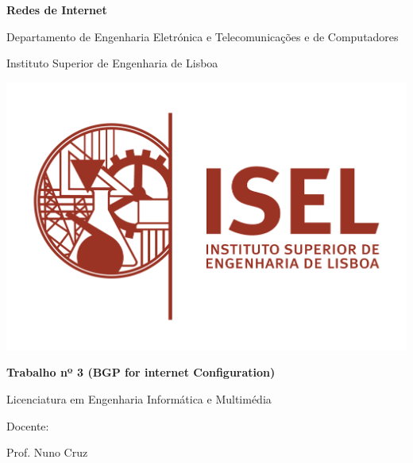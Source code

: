 \documentclass[11pt,english, openright, oneside]{book}
\begin{document}


\renewcommand{\contentsname}{Índice}

\begin{titlepage}
	\clearpage\thispagestyle{empty}
	\centering
	\vspace{1cm}

	{\Large \textbf{Redes de Internet}\par} {\Large Departamento de Engenharia
	Eletrónica e Telecomunicações e de Computadores \par} {\Large Instituto
	Superior de Engenharia de Lisboa \par}
		
	\vspace{0.5cm}
    
    \centering \includegraphics[scale=0.7]{imagens/ISEL.png}

	\vspace{1cm}
	
	{\Huge \textbf{Trabalho nº 3 (BGP for internet Configuration)}} \\
	\vspace{1cm}

        {\Large Licenciatura em Engenharia Informática e Multimédia}
        
	\vspace{0.5cm}
	
	
	
	
	\begin{center}
	{\normalsize Docente: \par Prof. Nuno Cruz \\
	
}
\end{center}
\end{titlepage}
\end{document}
